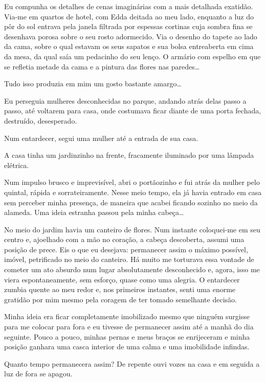 Eu compunha os detalhes de cenas imaginárias com a mais detalhada exatidão. Via-me em quartos de hotel, com Edda deitada ao meu lado, enquanto a luz do pôr do sol entrava pela janela filtrada por espessas cortinas cuja sombra fina se desenhava porosa sobre o seu rosto adormecido. Via o desenho do tapete ao lado da cama, sobre o qual estavam os seus sapatos e sua bolsa entreaberta em cima da mesa, da qual saía um pedacinho do seu lenço. O armário com espelho em que se refletia metade da cama e a pintura das flores nas paredes\ldots{}

Tudo isso produzia em mim um gosto bastante amargo\ldots{}

Eu perseguia mulheres desconhecidas no parque, andando atrás delas passo a passo, até voltarem para casa, onde costumava ficar diante de uma porta fechada, destruído, desesperado.

Num entardecer, segui uma mulher até a entrada de sua casa.

A casa tinha um jardinzinho na frente, fracamente iluminado por uma lâmpada elétrica.

Num impulso brusco e imprevisível, abri o portãozinho e fui atrás da mulher pelo quintal, rápida e sorrateiramente. Nesse meio tempo, ela já havia entrado em casa sem perceber minha presença, de maneira que acabei ficando sozinho no meio da alameda. Uma ideia estranha passou pela minha cabeça\ldots{}

No meio do jardim havia um canteiro de flores. Num instante coloquei-me em seu centro e, ajoelhado com a mão no coração, a cabeça descoberta, assumi uma posição de prece. Eis o que eu desejava: permanecer assim o máximo possível, imóvel, petrificado no meio do canteiro. Há muito me torturava essa vontade de cometer um ato absurdo num lugar absolutamente desconhecido e, agora, isso me viera espontaneamente, sem esforço, quase como uma alegria. O entardecer zumbia quente ao meu redor e, nos primeiros instantes, senti uma enorme gratidão por mim mesmo pela coragem de ter tomado semelhante decisão.

Minha ideia era ficar completamente imobilizado mesmo que ninguém surgisse para me colocar para fora e eu tivesse de permanecer assim até a manhã do dia seguinte. Pouco a pouco, minhas pernas e meus braços se enrijeceram e minha posição ganhara uma casca interior de uma calma e uma imobilidade infindas.

Quanto tempo permanecera assim? De repente ouvi vozes na casa e em seguida a luz de fora se apagou.

